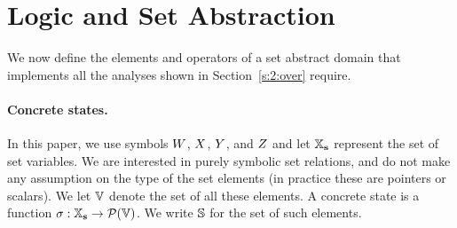 \section{Logic and Set Abstraction}
\label{sec:logic-and-set-abstraction} \label{s:3:abs}
We now define the elements and operators of a set abstract domain that
implements all the analyses shown in Section~\ref{s:2:over} require.

\paragraph{Concrete states.}
In this paper, we use symbols $W$, $X$, $Y$, and $Z$
and let $\mathbb{X}_{\bf s}$ represent the set of set variables.
We are interested in purely symbolic set relations, and do not make any
assumption on the type of the set elements (in practice these are pointers
or scalars).
We let \( \mathbb{V} \) denote the set of all these elements.
A concrete state is a function \( \sigma: \mathbb{X}_{\bf s} \rightarrow
\mathcal{P}(\mathbb{V}) \).
We write \( \mathbb{S} \) for the set of such elements.


